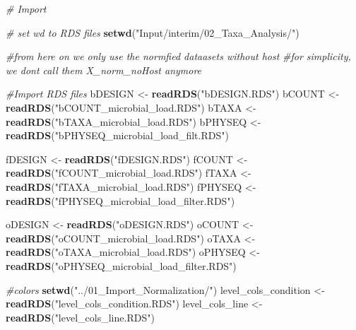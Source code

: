 \documentclass[
  11pt,
]{article}
\newenvironment{Shaded}{\begin{snugshade}}{\end{snugshade}}
\newcommand{\CommentTok}[1]{\textcolor[rgb]{0.56,0.35,0.01}{\textit{#1}}}
\newcommand{\FunctionTok}[1]{\textcolor[rgb]{0.13,0.29,0.53}{\textbf{#1}}}
\newcommand{\NormalTok}[1]{#1}
\newcommand{\OtherTok}[1]{\textcolor[rgb]{0.56,0.35,0.01}{#1}}
\newcommand{\StringTok}[1]{\textcolor[rgb]{0.31,0.60,0.02}{#1}}
\begin{document}
\begin{Shaded}
\begin{Highlighting}[]
\CommentTok{\# Import}

\CommentTok{\# set wd to RDS files}
\FunctionTok{setwd}\NormalTok{(}\StringTok{"Input/interim/02\_Taxa\_Analysis/"}\NormalTok{)}

\CommentTok{\#from here on we only use the normfied dataasets without host}
\CommentTok{\#for simplicity, we dont call them X\_norm\_noHost anymore}

\CommentTok{\#Import RDS files}
\NormalTok{bDESIGN }\OtherTok{\textless{}{-}} \FunctionTok{readRDS}\NormalTok{(}\StringTok{"bDESIGN.RDS"}\NormalTok{)}
\NormalTok{bCOUNT }\OtherTok{\textless{}{-}} \FunctionTok{readRDS}\NormalTok{(}\StringTok{"bCOUNT\_microbial\_load.RDS"}\NormalTok{)}
\NormalTok{bTAXA }\OtherTok{\textless{}{-}} \FunctionTok{readRDS}\NormalTok{(}\StringTok{"bTAXA\_microbial\_load.RDS"}\NormalTok{)}
\NormalTok{bPHYSEQ }\OtherTok{\textless{}{-}} \FunctionTok{readRDS}\NormalTok{(}\StringTok{"bPHYSEQ\_microbial\_load\_filt.RDS"}\NormalTok{)}

\NormalTok{fDESIGN }\OtherTok{\textless{}{-}} \FunctionTok{readRDS}\NormalTok{(}\StringTok{"fDESIGN.RDS"}\NormalTok{)}
\NormalTok{fCOUNT }\OtherTok{\textless{}{-}} \FunctionTok{readRDS}\NormalTok{(}\StringTok{"fCOUNT\_microbial\_load.RDS"}\NormalTok{)}
\NormalTok{fTAXA }\OtherTok{\textless{}{-}} \FunctionTok{readRDS}\NormalTok{(}\StringTok{"fTAXA\_microbial\_load.RDS"}\NormalTok{)}
\NormalTok{fPHYSEQ }\OtherTok{\textless{}{-}} \FunctionTok{readRDS}\NormalTok{(}\StringTok{"fPHYSEQ\_microbial\_load\_filter.RDS"}\NormalTok{)}

\NormalTok{oDESIGN }\OtherTok{\textless{}{-}} \FunctionTok{readRDS}\NormalTok{(}\StringTok{"oDESIGN.RDS"}\NormalTok{)}
\NormalTok{oCOUNT }\OtherTok{\textless{}{-}} \FunctionTok{readRDS}\NormalTok{(}\StringTok{"oCOUNT\_microbial\_load.RDS"}\NormalTok{)}
\NormalTok{oTAXA }\OtherTok{\textless{}{-}} \FunctionTok{readRDS}\NormalTok{(}\StringTok{"oTAXA\_microbial\_load.RDS"}\NormalTok{)}
\NormalTok{oPHYSEQ }\OtherTok{\textless{}{-}} \FunctionTok{readRDS}\NormalTok{(}\StringTok{"oPHYSEQ\_microbial\_load\_filter.RDS"}\NormalTok{)}

\CommentTok{\#colors}
\FunctionTok{setwd}\NormalTok{(}\StringTok{"../01\_Import\_Normalization/"}\NormalTok{)}
\NormalTok{level\_cols\_condition }\OtherTok{\textless{}{-}} \FunctionTok{readRDS}\NormalTok{(}\StringTok{"level\_cols\_condition.RDS"}\NormalTok{)}
\NormalTok{level\_cols\_line }\OtherTok{\textless{}{-}} \FunctionTok{readRDS}\NormalTok{(}\StringTok{"level\_cols\_line.RDS"}\NormalTok{)}
\end{Highlighting}
\end{Shaded}
\end{document}
